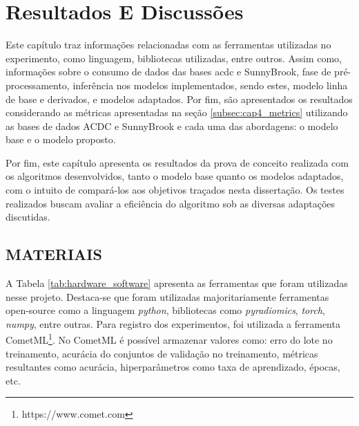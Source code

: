 \chapter{Resultados E Discussões}
\label{chap:resultados_discussoes}
\vspace{-\baselineskip} %


Este capítulo traz informações relacionadas com as ferramentas utilizadas no experimento, como linguagem, bibliotecas utilizadas, entre outros. Assim como, informações sobre o consumo de dados das bases \gls{acdc} e SunnyBrook, fase de pré-processamento, inferência nos modelos implementados, sendo estes, modelo linha de base e derivados, e modelos adaptados. Por fim, são apresentados os resultados considerando as métricas apresentadas na seção \ref{subsec:cap4_metrics} utilizando as bases de dados ACDC e SunnyBrook e cada uma das abordagens: o modelo base e o modelo proposto.

Por fim, este capítulo apresenta os resultados da prova de conceito realizada com os algoritmos desenvolvidos, tanto o modelo base quanto os modelos adaptados, com o intuito de compará-los aos objetivos traçados nesta dissertação. Os testes realizados buscam avaliar a eficiência do algoritmo sob as diversas adaptações discutidas. 

\section{MATERIAIS} 
\label{sec:cap5_materiais}

A Tabela \ref{tab:hardware_software} apresenta as ferramentas que foram utilizadas nesse projeto. Destaca-se que foram utilizadas majoritariamente ferramentas open-source como a linguagem \textit{python}, bibliotecas como \textit{pyradiomics}, \textit{torch}, \textit{numpy}, entre outras. Para registro dos experimentos, foi utilizada a ferramenta CometML\footnote{https://www.comet.com}. No CometML é possível armazenar valores como: erro do lote no treinamento, acurácia do conjuntos de validação no treinamento, métricas resultantes como acurácia, hiperparâmetros como taxa de aprendizado, épocas, etc.
\newline

